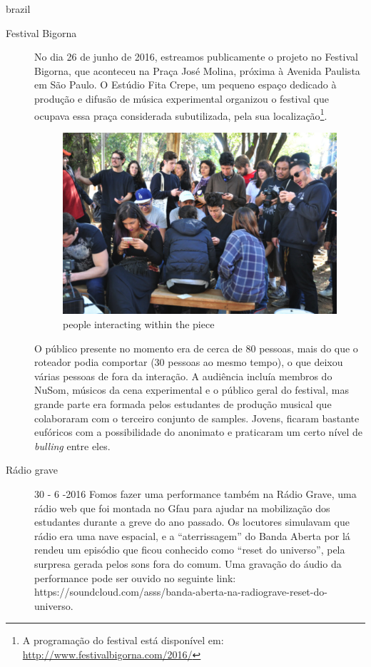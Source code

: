 \begin{otherlanguage*}{brazil}
\begin{description}
\item[Festival Bigorna]
No dia 26 de junho de 2016, estreamos publicamente o projeto no Festival Bigorna, que aconteceu na Praça José Molina, próxima à Avenida Paulista em São Paulo. O Estúdio Fita Crepe, um pequeno espaço dedicado à produção e difusão de música experimental organizou o festival que ocupava essa praça considerada subutilizada, pela sua localização\footnote{A programação do festival está disponível em: \url{http://www.festivalbigorna.com/2016/}}.

\begin{figure}[!ht]
    \centering
        \includegraphics[width=1\textwidth]{pictures/bigorna}
        \vspace{-10pt}
    \caption{people interacting within the piece}
    \label{fig:performer}
\end{figure}

O público presente no momento era de cerca de 80 pessoas, mais do que o roteador podia comportar (30 pessoas ao mesmo tempo), o que deixou várias pessoas de fora da interação. A audiência incluía membros do NuSom, músicos da cena experimental e o público geral do festival, mas grande parte era formada pelos estudantes de produção musical que colaboraram com o terceiro conjunto de samples. Jovens, ficaram bastante eufóricos com a possibilidade do anonimato e praticaram um certo nível de \emph{bulling} entre eles. 

\item[Rádio grave] 30 - 6 -2016
Fomos fazer uma performance também na Rádio Grave, uma rádio web que foi montada no Gfau para ajudar na mobilização dos  estudantes durante a greve do ano passado. Os locutores simulavam que rádio era uma nave espacial, e a ``aterrissagem'' do Banda Aberta por lá rendeu um episódio que ficou conhecido como ``reset do universo'', pela surpresa gerada pelos sons fora do comum. Uma gravação do áudio da performance pode ser ouvido no seguinte link: https://soundcloud.com/asss/banda-aberta-na-radiograve-reset-do-universo.



\end{description}
\end{otherlanguage*}
